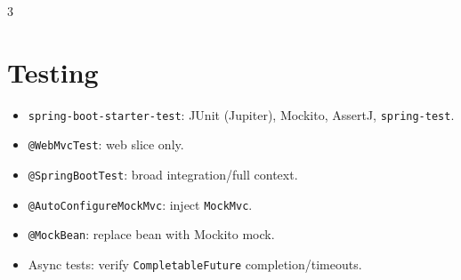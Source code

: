 \begin{multicols}{3}
\section*{Testing}
\begin{itemize}[leftmargin=*, nosep, topsep=0pt]
  \item \texttt{spring-boot-starter-test}: JUnit (Jupiter), Mockito, AssertJ, \texttt{spring-test}.
  \item \texttt{@WebMvcTest}: web slice only.
  \item \texttt{@SpringBootTest}: broad integration/full context.
  \item \texttt{@AutoConfigureMockMvc}: inject \texttt{MockMvc}.
  \item \texttt{@MockBean}: replace bean with Mockito mock.
  \item Async tests: verify \texttt{CompletableFuture} completion/timeouts.
\end{itemize}

\end{multicols}
